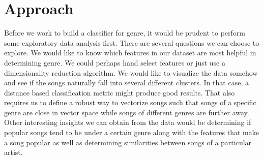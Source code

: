 \documentclass{article}
\begin{document}
\section*{Approach}
Before we work to build a classifier for genre, it would be prudent to perform some exploratory data analysis first. There are several questions we can choose to explore. We would like to know which features in our dataset are most helpful in determining genre. We could perhaps hand select features or just use a dimensionality reduction algorithm. We would like to visualize the data somehow and see if the songs naturally fall into several different clusters. In that case, a distance based classification metric might produce good results. That also requires us to define a robust way to vectorize songs such that songs of a specific genre are close in vector space while songs of different genres are further away. Other interesting insights we can obtain from the data would be determining if popular songs tend to be under a certain genre along with the features that make a song popular as well as determining similarities between songs of a particular artist.
\end{document}
